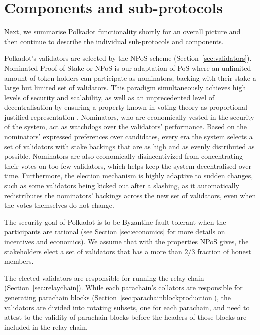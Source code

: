 \section{Components and sub-protocols}\label{sec:components}
Next, we summarise Polkadot functionality shortly for an overall picture and then continue to describe the individual sub-protocols and components. %

Polkadot's validators are selected by the NPoS scheme (Section~\ref{sec:validators}). Nominated Proof-of-Stake or NPoS is our adaptation of PoS where an unlimited amount of token holders can participate as nominators, backing with their stake a large but limited set of validators. This paradigm simultaneously achieves high levels of security and scalability, as well as an unprecedented level of decentralisation by ensuring a property known in voting theory as proportional justified representation \cite{sanchez2017proportional, brill2017phragmen}. Nominators, who are economically vested in the security of the system, act as watchdogs over the validators' performance. Based on the nominators' expressed preferences over candidates, every era the system selects a set of validators with stake backings that are as high and as evenly distributed as possible. Nominators are also economically disincentivized from concentrating their votes on too few validators, which helps keep the system decentralised over time. Furthermore, the election mechanism is highly adaptive to sudden changes, such as some validators being kicked out after a slashing, as it automatically redistributes the nominators' backings across the new set of validators, even when the votes themselves do not change.

The security goal of Polkadot is to be Byzantine fault tolerant when the participants are rational (see Section \ref{sec:economics} for more details on incentives and economics). We assume that with the properties NPoS gives, the stakeholders elect a set of validators that has a more than $2/3$ fraction of honest members.

The elected validators are responsible for running the relay chain (Section~\ref{sec:relaychain}). While each parachain's collators are responsible for generating parachain blocks (Section~\ref{sec:parachainblockproduction}), the validators are divided into rotating subsets, one for each parachain, and need to attest to the validity of parachain blocks before the headers of those blocks are included in the relay chain.

